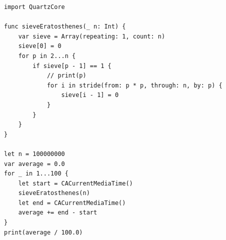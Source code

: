 \documentclass[a4paper, 10pt]{oblivoir}
\theoremstyle{definition}
\begin{document}
\begin{verbatim}
import QuartzCore

func sieveEratosthenes(_ n: Int) {
    var sieve = Array(repeating: 1, count: n)
    sieve[0] = 0
    for p in 2...n {
        if sieve[p - 1] == 1 {
            // print(p)
            for i in stride(from: p * p, through: n, by: p) {
                sieve[i - 1] = 0
            }
        }
    }
}

let n = 100000000
var average = 0.0
for _ in 1...100 {
    let start = CACurrentMediaTime()
    sieveEratosthenes(n)
    let end = CACurrentMediaTime()
    average += end - start
}
print(average / 100.0)
\end{verbatim}
\end{document}
